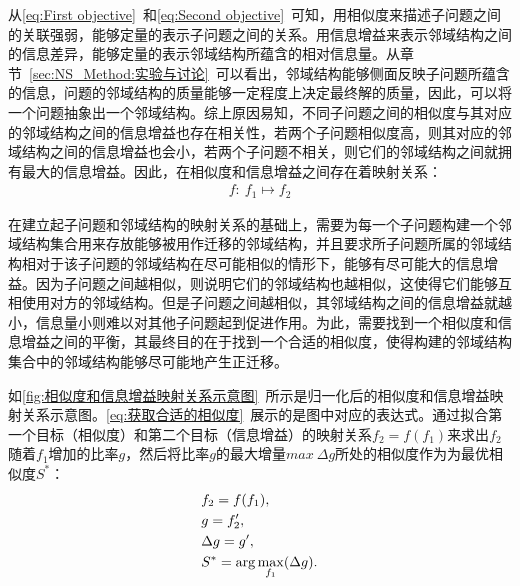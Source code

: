 \par
从\autoref{eq:First objective}~和\autoref{eq:Second objective}~可知，用相似度来描述子问题之间的关联强弱，能够定量的表示子问题之间的关系。用信息增益来表示邻域结构之间的信息差异，能够定量的表示邻域结构所蕴含的相对信息量。从章节~\ref{sec:NS_Method:实验与讨论}~可以看出，邻域结构能够侧面反映子问题所蕴含的信息，问题的邻域结构的质量能够一定程度上决定最终解的质量，因此，可以将一个问题抽象出一个邻域结构。综上原因易知，不同子问题之间的相似度与其对应的邻域结构之间的信息增益也存在相关性，若两个子问题相似度高，则其对应的邻域结构之间的信息增益也会小，若两个子问题不相关，则它们的邻域结构之间就拥有最大的信息增益。因此，在相似度和信息增益之间存在着映射关系：
\begin{align}
    \label{eq:相似度与信息增益的映射关系}
    f: \ f_1 \mapsto f_2
\end{align}
\par
在建立起子问题和邻域结构的映射关系的基础上，需要为每一个子问题构建一个邻域结构集合用来存放能够被用作迁移的邻域结构，并且要求所子问题所属的邻域结构相对于该子问题的邻域结构在尽可能相似的情形下，能够有尽可能大的信息增益。因为子问题之间越相似，则说明它们的邻域结构也越相似，这使得它们能够互相使用对方的邻域结构。但是子问题之间越相似，其邻域结构之间的信息增益就越小，信息量小则难以对其他子问题起到促进作用。为此，需要找到一个相似度和信息增益之间的平衡，其最终目的在于找到一个合适的相似度，使得构建的邻域结构集合中的邻域结构能够尽可能地产生正迁移。
\par
如\autoref{fig:相似度和信息增益映射关系示意图}~所示是归一化后的相似度和信息增益映射关系示意图。\autoref{eq:获取合适的相似度}~展示的是图中对应的表达式。通过拟合第一个目标（相似度）和第二个目标（信息增益）的映射关系$f_2 = f(f_1)$来求出$f_2$随着$f_1$增加的比率$g$，然后将比率$g$的最大增量$max \ \Delta g$所处的相似度作为为最优相似度$S^*$：
\begin{align}
    \label{eq:获取合适的相似度}
    &f_2 = f(f_1), \\
    &g = f_2', \notag \\
    &\Delta g = g', \notag \\
    &S^* = \arg\max_{f_1} (\Delta g).  \notag
\end{align}
